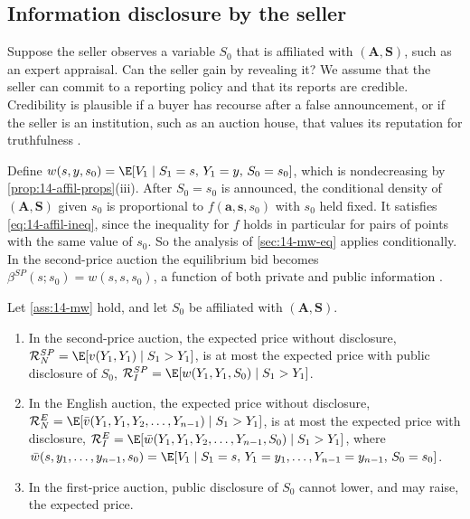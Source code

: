 \subsection{Information disclosure by the seller}\label{sec:14-mw-disclosure}

Suppose the seller observes a variable $S_0$ that is affiliated with $(\bm A,\bm S)$, such as an expert
appraisal. Can the seller gain by revealing it? We assume that the seller can commit to a reporting policy and that its
reports are credible. Credibility is plausible if a buyer has recourse after a false announcement,
or if the seller is an institution, such as an auction house, that values its reputation for truthfulness
\citep[footnote~18]{MilgromWeber1982}.

Define $w(s,y,s_0)=\E[V_1\mid S_1=s,\,Y_1=y,\,S_0=s_0]$, which is nondecreasing by
\cref{prop:14-affil-props}(iii). After $S_0=s_0$ is announced, the conditional density of $(\bm A,\bm S)$ given
$s_0$ is proportional to $f(\bm a,\bm s,s_0)$ with $s_0$ held fixed. It satisfies \eqref{eq:14-affil-ineq}, since
the inequality for $f$ holds in particular for pairs of points with the same value of $s_0$. So the analysis of
\cref{sec:14-mw-eq} applies conditionally. In the second-price auction the equilibrium bid becomes
$\beta^{SP}(s;s_0)=w(s,s,s_0)$, a function of both private and public information
\citep[p.~1102]{MilgromWeber1982}.

\begin{proposition}\label{prop:14-mw-disclosure}
Let \cref{ass:14-mw} hold, and let $S_0$ be affiliated with $(\bm A,\bm S)$.
\begin{enumerate}[label=(\roman*)]
  \item In the second-price auction, the expected price without disclosure,
  $\mathcal R^{SP}_N=\E[v(Y_1,Y_1)\mid S_1>Y_1]$, is at most the expected price with public disclosure of
  $S_0$, $\mathcal R^{SP}_I=\E[w(Y_1,Y_1,S_0)\mid S_1>Y_1]$.
  \item In the English auction, the expected price without disclosure,
  $\mathcal R^E_N=\E[\bar v(Y_1,Y_1,Y_2,\dots,Y_{n-1})\mid S_1>Y_1]$, is at most the expected price with
  disclosure, $\mathcal R^E_I=\E[\bar w(Y_1,Y_1,Y_2,\dots,Y_{n-1},S_0)\mid S_1>Y_1]$, where
  $\bar w(s,y_1,\dots,y_{n-1},s_0)=\E[V_1\mid S_1=s,\,Y_1=y_1,\dots,Y_{n-1}=y_{n-1},\,S_0=s_0]$.
  \item In the first-price auction, public disclosure of $S_0$ cannot lower, and may raise, the expected price.
\end{enumerate}
\end{proposition}

